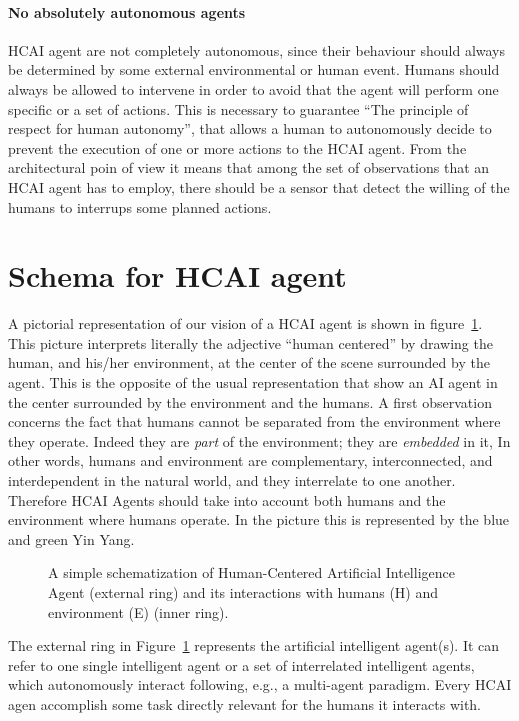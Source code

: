 \paragraph{No absolutely autonomous agents} HCAI agent are not
completely autonomous, since their behaviour should always be determined by
some external environmental or human event. Humans should always be
allowed to intervene in order to avoid that the agent will perform
one specific or a set of actions. This is necessary to guarantee ``The
principle of respect for human autonomy'', that allows a human to
autonomously decide to prevent the execution of one or more actions to
the HCAI agent. From the architectural poin of view it means that
among the set of observations that an HCAI agent has to employ, there
should be a sensor that detect the willing of the humans to interrups
some planned actions.

\section{Schema for HCAI agent}
A pictorial representation of our vision of a HCAI agent is shown in
figure~\ref{fig:hcai-onion}. This picture interprets literally the adjective 
``human centered'' by drawing the human, and his/her environment, at
the center of the scene surrounded by the agent. This is the opposite
of the usual representation that
show an AI agent in the center surrounded by the environment and the humans.
A first observation concerns the fact
that humans cannot be separated from the environment where they
operate. Indeed they are \emph{part} of the environment; they are
\emph{embedded} in it, In other words, humans and environment are
complementary, interconnected, and interdependent in the natural
world, and they interrelate to one another. Therefore HCAI Agents should
take into account both humans and the environment where humans
operate. In the picture this is represented by the blue and green Yin
Yang. 
\begin{figure}[h]
  \begin{center}
    
\end{center}
\caption{\label{fig:hcai-onion} 
A simple
  schematization of Human-Centered Artificial Intelligence Agent 
 (external ring) and its interactions with
  humans (H) and environment (E) (inner ring).}
\end{figure}

The external ring in Figure~\ref{fig:hcai-onion} represents the
artificial intelligent agent(s). It can refer to one single
intelligent agent or a set of interrelated intelligent agents, which
autonomously interact following, e.g., a multi-agent paradigm. Every
HCAI agen accomplish some task directly relevant for the humans it
interacts with.

